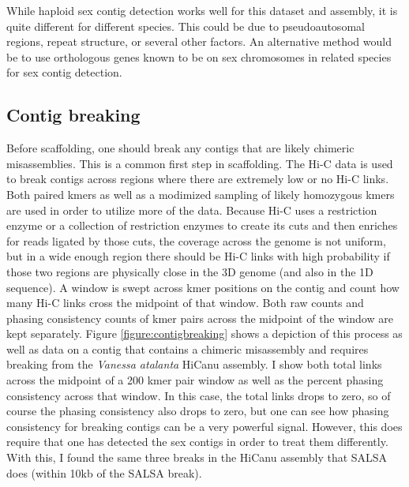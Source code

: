 \par{
While haploid sex contig detection works well for this dataset and assembly, it is quite different for different species. This could be due to pseudoautosomal regions, repeat structure, or several other factors. An alternative method would be to use orthologous genes known to be on sex chromosomes in related species for sex contig detection. 
}

\subsection{Contig breaking}

\par{
Before scaffolding, one should break any contigs that are likely chimeric misassemblies. This is a common first step in scaffolding\cite{SALSA}\cite{scaffoldingreview}. The Hi-C data is used to break contigs across regions where there are extremely low or no Hi-C links. Both paired kmers as well as a modimized sampling of likely homozygous kmers are used in order to utilize more of the data. Because Hi-C uses a restriction enzyme or a collection of restriction enzymes to create its cuts and then enriches for reads ligated by those cuts, the coverage across the genome is not uniform, but in a wide enough region there should be Hi-C links with high probability if those two regions are physically close in the 3D genome (and also in the 1D sequence). A window is swept across kmer positions on the contig and count how many Hi-C links cross the midpoint of that window. Both raw counts and phasing consistency counts of kmer pairs across the midpoint of the window are kept separately. Figure \ref{figure:contigbreaking} shows a depiction of this process as well as data on a contig that contains a chimeric misassembly and requires breaking from the \textit{Vanessa atalanta} HiCanu assembly. I show both total links across the midpoint of a 200 kmer pair window as well as the percent phasing consistency across that window. In this case, the total links drops to zero, so of course the phasing consistency also drops to zero, but one can see how phasing consistency for breaking contigs can be a very powerful signal. However, this does require that one has detected the sex contigs in order to treat them differently. With this, I found the same three breaks in the HiCanu assembly that SALSA does (within 10kb of the SALSA break).
}

